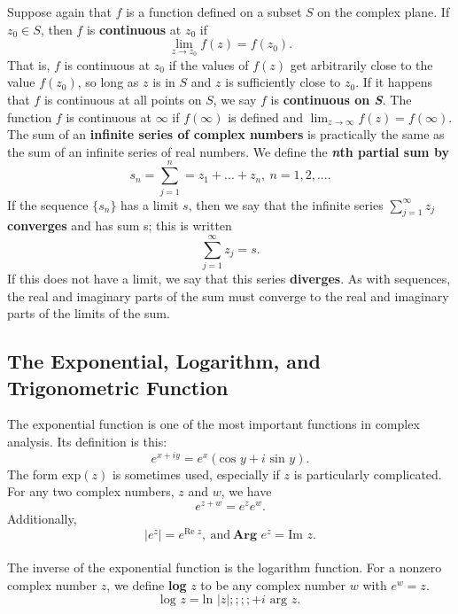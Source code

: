 \documentclass[12pt,letterpaper]{article}
\begin{document}
Suppose again that \(f\) is a function defined on a subset \(S\) on the complex plane. If \(z_{0} \in S\), then \(f\) is \textbf{continuous} at \(z_{0}\) if \[\lim_{z \to z_{0}} f(z) = f(z_{0}).\] That is, \(f\) is continuous at \(z_{0}\) if the values of \(f(z)\) get arbitrarily close to the value \(f(z_{0})\), so long as \(z\) is in \(S\) and \(z\) is sufficiently close to \(z_{0}\). If it happens that \(f\) is continuous at all points on \(S\), we say \(f\) is \textbf{continuous on \textit{S}}. The function \(f\) is continuous at \(\infty\) if \(f(\infty)\) is defined and \(\lim_{z \to \infty} f(z) = f(\infty)\). \\

The sum of an \textbf{infinite series of complex numbers} is 
practically the same as the sum of an infinite series of real numbers. We define the \textbf{\textit{n}th partial sum by} \[s_{n} = \sum\limits_{j = 1}^{n} = z_{1} + ... + z_{n},\ n = 1,2,... .\]  If the sequence \(\{s_{n}\}\) has a limit \(s\), then we say that the infinite series \(\sum\limits_{j = 1}^{\infty} z_{j}\) \textbf{converges} and has sum s; this is written \[\sum\limits_{j = 1}^{\infty} z_{j} = s.\] If this does not have a limit, we say that this series \textbf{diverges}. As with sequences, the real and imaginary parts of the sum must converge to the real and imaginary parts of the limits of the sum.

\subsection{The Exponential, Logarithm, and Trigonometric Function}

The exponential function is one of the most important functions in complex analysis. Its definition is this: \[e^{x + iy} = e^{x}(\text{cos }y + i\text{ sin }y).\] The form \(\text{exp}(z)\) is sometimes used, especially if \(z\) is particularly complicated. For any two complex numbers, \(z\) and \(w\), we have \[e^{z + w} = e^{z}e^{w}.\] Additionally, \[|e^{z}| = e^{\text{Re } z},\ \text{and}\ \textbf{Arg } e^{z} = \text{Im } z.\] \\

The inverse of the exponential function is the logarithm function. For a nonzero complex number \(z\), we define \textbf{log} \(z\) to be any complex number \(w\) with \(e^{w} = z\). \[\text{log } z = \text{ln } |z|;;;; + i \text{ arg } z.\]
\end{document}
